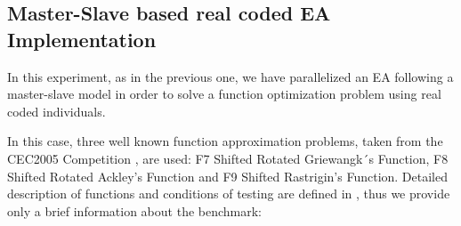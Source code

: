 \documentclass[final,1p,times]{elsarticle}
\begin{document}



\subsection{Master-Slave based real coded EA Implementation}
\label{subsect:experimentREVIEW}

In this experiment, as in the previous one, we have parallelized an EA following a master-slave model in order to solve a function optimization problem using real coded individuals. 

In this case, three well known function approximation problems, taken from the CEC2005 Competition \cite{HansenCOMPETITION1}, are used: F7 Shifted Rotated Griewangk´s Function, F8 Shifted Rotated Ackley's Function and F9 Shifted Rastrigin's Function.
Detailed description of functions and conditions of testing are defined in \cite{HansenCOMPETITION2}, thus we provide only a brief information about the benchmark:
\end{document}
